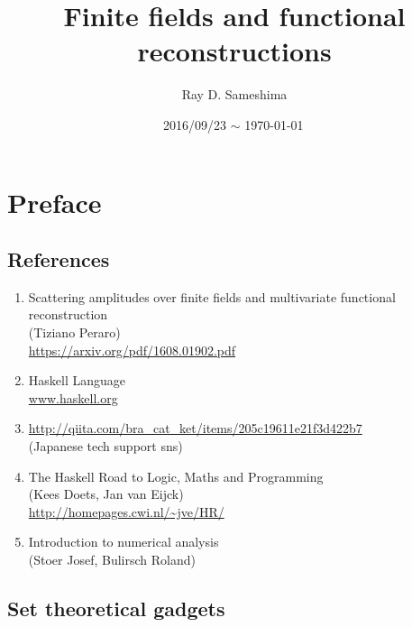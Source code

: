 \documentclass[11pt]{book}
\begin{document}
\lstset{ language = Haskell
         , numbers = left
         , breaklines = true
         , basicstyle = \small\ttfamily
         }

\newcommand{\Slash}[1]{{\ooalign{\hfil/\crcr$#1$}}}

\title{Finite fields and functional reconstructions}
\author{Ray D. Sameshima}
\date{2016/09/23 $\sim$ \today \, \currenttime}
\maketitle

\tableofcontents

\setcounter{chapter}{-1}
\chapter{Preface}
\section{References}
\begin{enumerate}
\item \label{Tiziano}
Scattering amplitudes over finite fields and multivariate functional reconstruction\\
(Tiziano Peraro)\\
\url{https://arxiv.org/pdf/1608.01902.pdf}

\item Haskell Language \\
\url{www.haskell.org}

\item \url{http://qiita.com/bra_cat_ket/items/205c19611e21f3d422b7}\\
 (Japanese tech support sns)

\item \label{Haskellroad}
The Haskell Road to Logic, Maths and Programming\\ 
(Kees Doets, Jan van Eijck)\\
\url{http://homepages.cwi.nl/~jve/HR/}

\item \label{Numerical}
Introduction to numerical analysis\\ 
(Stoer Josef, Bulirsch Roland)

\end{enumerate}

\section{Set theoretical gadgets}
\end{document}
